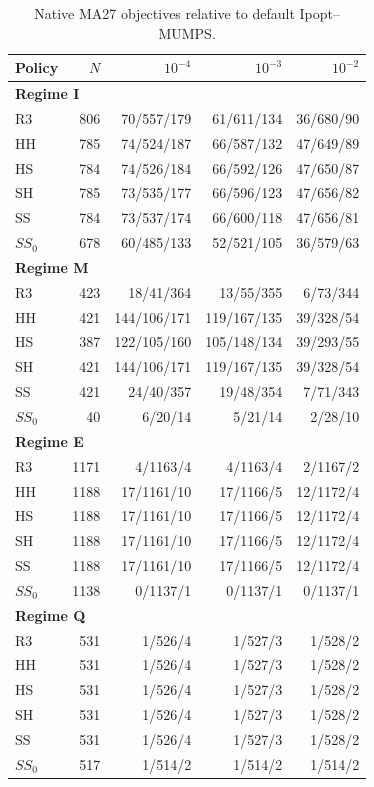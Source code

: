 \documentclass[pdflatex,sn-mathphys-num]{sn-jnl}
\theoremstyle{thmstyleone}
\theoremstyle{thmstylethree}
\begin{document}
\begin{table}[!htbp]
\centering\small
\caption{Native MA27 objectives relative to default Ipopt--MUMPS.}
\label{tab:thresholds-mumps}

\begin{tabular}{lrrrr}
\toprule
Policy & $N$ & $10^{-4}$ & $10^{-3}$ & $10^{-2}$ \\
\midrule
\multicolumn{5}{l}{\textbf{Regime I}} \\
R3 & 806 & 70/557/179 & 61/611/134 & 36/680/90 \\
HH & 785 & 74/524/187 & 66/587/132 & 47/649/89 \\
HS & 784 & 74/526/184 & 66/592/126 & 47/650/87 \\
SH & 785 & 73/535/177 & 66/596/123 & 47/656/82 \\
SS & 784 & 73/537/174 & 66/600/118 & 47/656/81 \\
$SS_0$ & 678 & 60/485/133 & 52/521/105 & 36/579/63 \\
\midrule
\multicolumn{5}{l}{\textbf{Regime M}} \\
R3 & 423 & 18/41/364 & 13/55/355 & 6/73/344 \\
HH & 421 & 144/106/171 & 119/167/135 & 39/328/54 \\
HS & 387 & 122/105/160 & 105/148/134 & 39/293/55 \\
SH & 421 & 144/106/171 & 119/167/135 & 39/328/54 \\
SS & 421 & 24/40/357 & 19/48/354 & 7/71/343 \\
$SS_0$ & 40 & 6/20/14 & 5/21/14 & 2/28/10 \\
\midrule
\multicolumn{5}{l}{\textbf{Regime E}} \\
R3 & 1171 & 4/1163/4 & 4/1163/4 & 2/1167/2 \\
HH & 1188 & 17/1161/10 & 17/1166/5 & 12/1172/4 \\
HS & 1188 & 17/1161/10 & 17/1166/5 & 12/1172/4 \\
SH & 1188 & 17/1161/10 & 17/1166/5 & 12/1172/4 \\
SS & 1188 & 17/1161/10 & 17/1166/5 & 12/1172/4 \\
$SS_0$ & 1138 & 0/1137/1 & 0/1137/1 & 0/1137/1 \\
\midrule
\multicolumn{5}{l}{\textbf{Regime Q}} \\
R3 & 531 & 1/526/4 & 1/527/3 & 1/528/2 \\
HH & 531 & 1/526/4 & 1/527/3 & 1/528/2 \\
HS & 531 & 1/526/4 & 1/527/3 & 1/528/2 \\
SH & 531 & 1/526/4 & 1/527/3 & 1/528/2 \\
SS & 531 & 1/526/4 & 1/527/3 & 1/528/2 \\
$SS_0$ & 517 & 1/514/2 & 1/514/2 & 1/514/2 \\
\bottomrule
\end{tabular}


\end{table}
\end{document}
